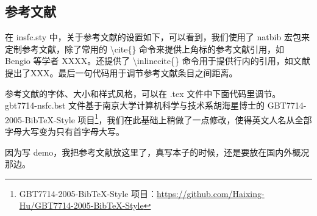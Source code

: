 




\subsection{参考文献}
在 insfc.sty 中，关于参考文献的设置如下，可以看到，我们使用了 natbib 宏包来定制参考文献，除了常用的 \textbackslash cite\{\} 命令来提供上角标的参考文献引用，如 Bengio 等学者 XXXX。还提供了 \textbackslash inlinecite\{\} 命令用于提供行内的引用，如文献提出了XXX。最后一句代码用于调节参考文献条目之间距离。


参考文献的字体、大小和样式风格，可以在 .tex 文件中下面代码里调节。gbt7714-nsfc.bst 文件基于南京大学计算机科学与技术系胡海星博士的 GBT7714-2005-BibTeX-Style 项目\footnote{GBT7714-2005-BibTeX-Style 项目：\href{https://github.com/Haixing-Hu/GBT7714-2005-BibTeX-Style}{https://github.com/Haixing-Hu/GBT7714-2005-BibTeX-Style}}，我们在此基础上稍做了一点修改，使得英文人名从全部字母大写变为只有首字母大写。

% 		
% 		

因为写 demo，我把参考文献放这里了，真写本子的时候，还是要放在国内外概况那边。

\begin{bibenv}
	 
\end{bibenv}


